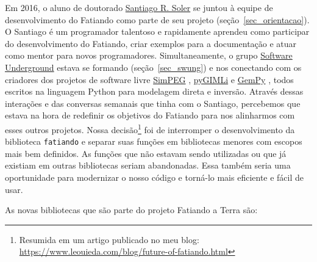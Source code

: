\documentclass[10pt,a4paper,oneside]{book}
\newcommand{\SantiagoLink}{\href{https://www.santisoler.com/}{Santiago R. Soler}}
\begin{document}
Em 2016, o aluno de doutorado \SantiagoLink{} se juntou à equipe de
desenvolvimento do Fatiando como parte de seu projeto
(seção~\ref{sec_orientacao}).
O Santiago é um programador talentoso e rapidamente aprendeu como participar
do desenvolvimento do Fatiando, criar exemplos para a documentação e atuar como
mentor para novos programadores.
Simultaneamente, o grupo
\href{https://softwareunderground.org/}{Software Underground} estava se
formando (seção~\ref{sec_swung}) e nos conectando com os criadores dos projetos
de software livre
\href{https://simpeg.xyz/}{SimPEG} \citep{Cockett2015},
\href{https://www.pygimli.org}{pyGIMLi} \citep{Rucker2017} e
\href{https://www.gempy.org/}{GemPy} \citep{delaVarga2019},
todos escritos na linguagem Python para modelagem direta e inversão.
Através dessas interações e das conversas semanais que tinha com o Santiago,
percebemos que estava na hora de redefinir os objetivos do Fatiando para
nos alinharmos com esses outros projetos.
Nossa decisão\footnote{Resumida em um artigo publicado no meu blog:
\url{https://www.leouieda.com/blog/future-of-fatiando.html}} foi de
interromper o desenvolvimento da biblioteca \texttt{fatiando} e separar suas
funções em bibliotecas menores com escopos mais bem definidos.
As funções que não estavam sendo utilizadas ou que já existiam em outras
bibliotecas seriam abandonadas.
Essa também seria uma oportunidade para modernizar o nosso código e torná-lo
mais eficiente e fácil de usar.

As novas bibliotecas que são parte do projeto Fatiando a Terra são:
\end{document}
